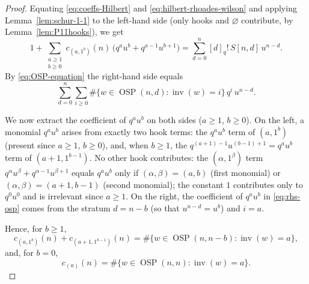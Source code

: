 \documentclass[11pt]{amsart}
\theoremstyle{definition}
\DeclareMathOperator{\OSP}{OSP}
\DeclareMathOperator{\inv}{inv}
\begin{document}
\begin{proof}
Equating \eqref{eq:coeffs-Hilbert} and \eqref{eq:hilbert-rhoades-wilson} and
applying Lemma~\ref{lem:schur-1-1} to the left-hand side (only hooks and
$\varnothing$ contribute, by Lemma~\ref{lem:P11hooks}), we get
\begin{equation}\label{eq:master}
1 + \sum_{\substack{a \geq 1\\ b \geq 0}} c_{(a,1^b)}(n)\,
\big(q^a u^b+q^{a-1}u^{b+1}\big)
= \sum_{d=0}^n [d]_q!\,S[n,d]\,u^{n-d}.
\end{equation}
By \eqref{eq:OSP-equation} the right-hand side equals
\begin{equation}\label{eq:rhs-osp}
\sum_{d=0}^n \sum_{i\ge0} \#\{w\in\OSP(n,d):\inv(w)=i\}\,q^i\,u^{n-d}.
\end{equation}

We now extract the coefficient of $q^a u^b$ on both sides
($a\ge1$, $b\ge0$). On the left, a monomial $q^au^b$ arises from exactly two
hook terms: the $q^{a}u^{b}$ term of $(a,1^b)$ (present since $a\ge1$, $b\ge0$),
and, when $b\ge1$, the $q^{(a+1)-1}u^{(b-1)+1}=q^au^b$ term of
$(a+1,1^{b-1})$. No other hook contributes: the $(\alpha,1^\beta)$ term
$q^{\alpha}u^{\beta}+q^{\alpha-1}u^{\beta+1}$ equals $q^au^b$ only if
$(\alpha,\beta)=(a,b)$ (first monomial) or $(\alpha,\beta)=(a+1,b-1)$ (second
monomial); the constant $1$ contributes only to $q^0u^0$ and is irrelevant since
$a\ge1$. On the right, the coefficient of $q^au^b$ in \eqref{eq:rhs-osp} comes
from the stratum $d=n-b$ (so that $u^{n-d}=u^{b}$) and $i=a$.

Hence, for $b\ge1$,
\begin{equation}\label{eq:recurrence}
c_{(a,1^b)}(n)+c_{(a+1,1^{b-1})}(n)
= \#\{w\in\OSP(n,n-b):\inv(w)=a\},
\end{equation}
and, for $b=0$,
\begin{equation}\label{eq:base}
c_{(a)}(n) = \#\{w\in\OSP(n,n):\inv(w)=a\}.
\end{equation}


\end{proof}
\end{document}
